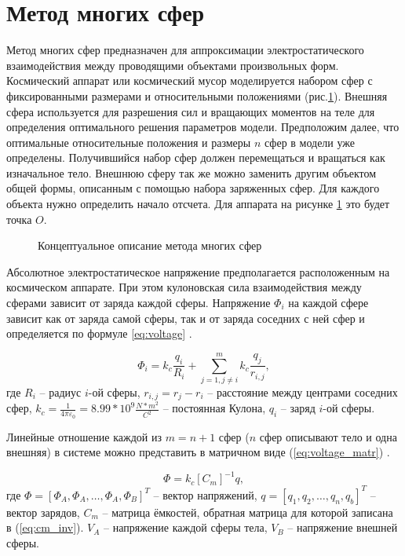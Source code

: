 \section{Метод многих сфер}

Метод многих сфер предназначен для аппроксимации электростатического взаимодействия между проводящими объектами произвольных форм.
Космический аппарат или космический мусор моделируется набором сфер с фиксированными размерами и относительными положениями (рис.\ref{ris:sp_msm}).
Внешняя сфера используется для разрешения сил и вращающих моментов на теле для определения оптимального решения параметров модели.
Предположим далее, что оптимальные относительные положения и размеры $n$ сфер в модели уже определены.
Получившийся набор сфер должен перемещаться и вращаться как изначальное тело.
Внешнюю сферу так же можно заменить другим объектом общей формы, описанным с помощью набора заряженных сфер.
Для каждого объекта нужно определить начало отсчета. Для аппарата на рисунке \ref{ris:sp_msm} это будет точка $O$. 

\begin{figure}[H]
	\caption{Концептуальное описание метода многих сфер}
	\label{ris:sp_msm}
\end{figure}

Абсолютное электростатическое напряжение предполагается расположенным на космическом аппарате.
При этом кулоновская сила взаимодействия между сферами зависит от заряда каждой сферы.
Напряжение $\Phi_i$ на каждой сфере зависит как от заряда самой сферы, так и от заряда соседних с ней сфер и определяется по формуле \ref{eq:voltage} \cite{2sph}.

\begin{equation}
\label{eq:voltage}
	\Phi_i = k_c \frac{q_i}{R_i} + \sum_{j=1,j\neq i}^{m} k_c \frac{q_j}{r_{i,j}},
\end{equation}
где $R_i$ – радиус $i$-ой сферы, $r_{i,j} = r_j - r_i$ – расстояние между центрами соседних сфер, $k_c = \frac{1}{4\pi\varepsilon_0} = 8.99 * 10^9 \frac{N*m^2}{C^2}$ – постоянная Кулона, $q_i$ – заряд $i$-ой сферы.

Линейные отношение каждой из $m = n + 1$ сфер ($n$ сфер описывают тело и одна внешняя) в системе можно представить в матричном виде (\ref{eq:voltage_matr}) \cite{msm}.

\begin{equation}
\label{eq:voltage_matr}
	\Phi = k_c [C_m]^{-1} q,
\end{equation}
где $\Phi = [\Phi_A, \Phi_A, \dots, \Phi_A, \Phi_B]^T$ – вектор напряжений, $q = [q_1, q_2, \dots, q_n, q_b]^T$ – вектор зарядов, $C_m$ – матрица ёмкостей, обратная матрица для которой записана в (\ref{eq:cm_inv}).
$V_A$ – напряжение каждой сферы тела, $V_B$ – напряжение внешней сферы.


